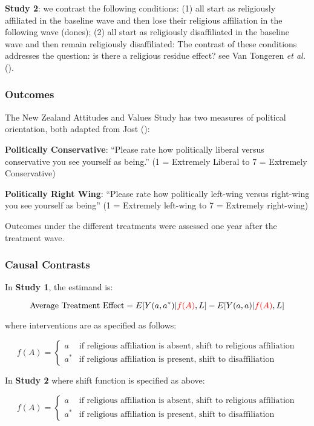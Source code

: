 \documentclass[
  singlecolumn]{article}
\begin{document}
\textbf{Study 2}: we contrast the following conditions: (1) all start as
religiously affiliated in the baseline wave and then lose their
religious affiliation in the following wave (dones); (2) all start as
religiously disaffiliated in the baseline wave and then remain
religiously disaffiliated: The contrast of these conditions addresses
the question: is there a religious residue effect? see Van Tongeren
\emph{et al.} ().

\subsubsection{Outcomes}\label{outcomes}

The New Zealand Attitudes and Values Study has two measures of political
orientation, both adapted from Jost
():

\textbf{Politically Conservative}: ``Please rate how politically liberal
versus conservative you see yourself as being.'' (1 = Extremely Liberal
to 7 = Extremely Conservative)

\textbf{Politically Right Wing}: ``Please rate how politically left-wing
versus right-wing you see yourself as being'' (1 = Extremely left-wing
to 7 = Extremely right-wing)

Outcomes under the different treatments were assessed one year after the
treatment wave.

\subsubsection{Causal Contrasts}\label{causal-contrasts}

In \textbf{Study 1}, the estimand is:

\[ 
\text{Average Treatment Effect} = E[Y(a,a^*)|\textcolor{red}{f(A)},L] -  E[Y(a, a)|\textcolor{red}{f(A)},L] 
\]

where interventions are as specified as follows:

\[
   f(A) = \begin{cases} a & \text{if religious affiliation is absent, shift to religious affiliation} \\ 
   a^* & \text{if religious affiliation is present, shift to disaffiliation} \end{cases}
   \]

In \textbf{Study 2} where shift function is specified as above:

\[
f(A) = \begin{cases} a & \text{if religious affiliation is absent, shift to religious affiliation} \\ 
   a^* & \text{if religious affiliation is present, shift to disaffiliation} \end{cases}
\]
\end{document}
